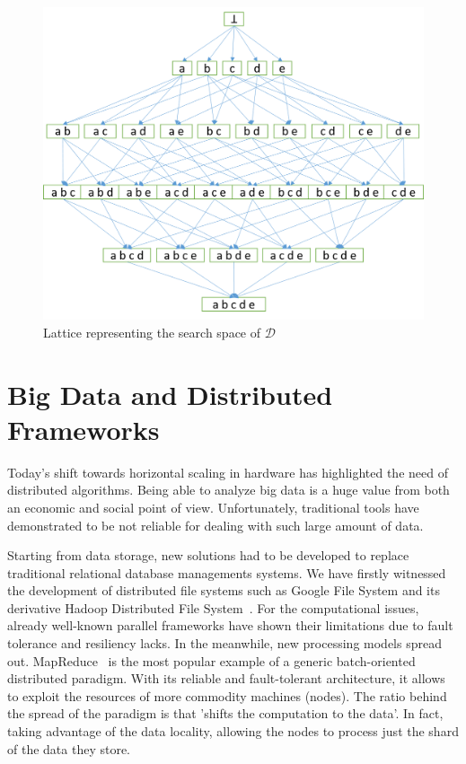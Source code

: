 \begin{figure}[!t]
\includegraphics[width=5in]{chapters/lattices.png}
\caption{Lattice representing the search space of $\mathcal{D}$}
\label{lattice}
\end{figure}

\section{Big Data and Distributed Frameworks}
Today's shift towards horizontal scaling in hardware has highlighted the
need of distributed algorithms. Being able to analyze big data is a huge value from both an economic and social point of view. Unfortunately, traditional tools have demonstrated to be not reliable for dealing with such large amount of data.

Starting from data storage, new solutions had to be developed to replace traditional relational database managements systems. We have firstly witnessed the development of distributed file systems such as Google File System \cite{ghemawat2003google} and its derivative Hadoop Distributed File System~\cite{HDFS}. For the computational issues, already well-known parallel frameworks have shown their limitations due to fault tolerance and resiliency lacks. In the meanwhile, new processing models spread out. 
MapReduce~\cite{ArticoloMapReduceGoogle} is the most popular example of a generic batch-oriented distributed paradigm. With its reliable and fault-tolerant architecture, it allows to exploit the resources of more commodity machines (nodes). The ratio behind the spread of the paradigm is that 'shifts the computation to the data'.
In fact, taking advantage of the data locality, allowing the nodes to process just the shard of the data they store.

